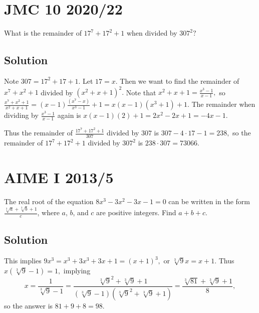 \documentclass[mast]{lucky}
\begin{document}
\pagebreak\section{JMC 10 2020/22}

What is the remainder of $17^7+17^2+1$ when divided by $307^2?$

\subsection{Solution}

Note $307=17^2+17+1.$ Let $17=x.$ Then we want to find the remainder of $x^7+x^2+1$ divided by $(x^2+x+1)^2.$ Note that $x^2+x+1=\frac{x^3-1}{x-1},$ so $\frac{x^7+x^2+1}{x^2+x+1}=(x-1)\frac{(x^7-x)}{x^3-1}+1=x(x-1)(x^3+1)+1.$ The remainder when dividing by $\frac{x^3-1}{x-1}$ again is $x(x-1)(2)+1=2x^2-2x+1=-4x-1.$

Thus the remainder of $\frac{17^7+17^2+1}{307}$ divided by $307$ is $307-4\cdot 17-1=238,$ so the remainder of $17^7+17^2+1$ divided by $307^2$ is $238\cdot 307=73066.$

\pagebreak\section{AIME I 2013/5}

The real root of the equation $8x^3 - 3x^2 - 3x - 1 = 0$ can be written in the form $\frac{\sqrt[3]a + \sqrt[3]b + 1}{c}$, where $a$, $b$, and $c$ are positive integers. Find $a+b+c$.

\subsection{Solution}

This implies $9x^3=x^3+3x^3+3x+1=(x+1)^3,$ or $\sqrt[3]{9}x=x+1.$ Thus $x(\sqrt[3]{9}-1)=1,$ implying
\[x=\frac{1}{\sqrt[3]{9}-1}=\frac{\sqrt[3]{9}^2+\sqrt[3]{9}+1}{(\sqrt[3]{9}-1)(\sqrt[3]{9}^2+\sqrt[3]{9}+1)}=\frac{\sqrt[3]{81}+\sqrt[3]{9}+1}{8},\]
so the answer is $81+9+8=98.$

%
%
%
\end{document}

